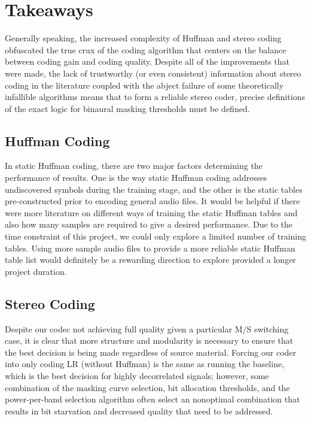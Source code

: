 \documentclass{vldb}
\begin{document}
\section{Takeaways}
Generally speaking, the increased complexity of Huffman and stereo coding obfuscated the true crux of the coding algorithm that centers on the balance between coding gain and coding quality. Despite all of the improvements that were made, the lack of trustworthy (or even consistent) information about stereo coding in the literature coupled with the abject failure of some theoretically infallible algorithms means that to form a reliable stereo coder, precise definitions of the exact logic for binaural masking thresholds must be defined. 

\subsection{Huffman Coding}
In static Huffman coding, there are two major factors determining the performance of results. One is the way static Huffman coding addresses undiscovered symbols during the training stage, and the other is the static tables pre-constructed prior to encoding general audio files. It would be helpful if there were more literature on different ways of training the static Huffman tables and also how many samples are required to give a desired performance. Due to the time constraint of this project, we could only explore a limited number of training tables. Using more sample audio files to provide a more reliable static Huffman table list would definitely be a rewarding direction to explore provided a longer project duration.

\subsection{Stereo Coding}
Despite our codec not achieving full quality given a particular M/S switching case, it is clear that more structure and modularity is necessary to ensure that the best decision is being made regardless of source material. Forcing our coder into only coding LR (without Huffman) is the same as running the baseline, which is the best decision for highly decorrelated signals; however, some combination of the masking curve selection, bit allocation thresholds, and the power-per-band selection algorithm often select an nonoptimal combination that results in bit starvation and decreased quality that need to be addressed.

\balance
\end{document}
